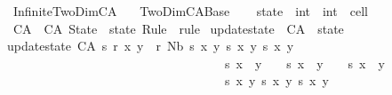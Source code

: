 %
\begin{isabellebody}%
%
%
\isadelimdocument
%
\endisadelimdocument
%
\isatagdocument
%
\isamarkuptrue%
%
\endisatagdocument
{\isafolddocument}%
%
\isadelimdocument
%
\endisadelimdocument
%
\isadelimtheory
%
\endisadelimtheory
%
\isatagtheory
{}\isamarkupfalse%
\ Infinite{\isacharunderscore}TwoDim{\isacharunderscore}CA\isanewline
\ \ \ TwoDim{\isacharunderscore}CA{\isacharunderscore}Base\isanewline
{}%
\endisatagtheory
{\isafoldtheory}%
%
\isadelimtheory
\isanewline
%
\endisadelimtheory
\ \ \isanewline
{}\isamarkupfalse%
\ state\ {\isacharequal}\ {\isachardoublequoteopen}int\ {\isasymRightarrow}\ int\ {\isasymRightarrow}\ cell{\isachardoublequoteclose}\isanewline
\isanewline
{}\isamarkupfalse%
\ CA\ {\isacharequal}\ CA\ {\isacharparenleft}State\ {\isacharcolon}\ state{\isacharparenright}\ {\isacharparenleft}Rule\ {\isacharcolon}\ rule{\isacharparenright}\isanewline
\isanewline
\isanewline
{}\isamarkupfalse%
\ update{\isacharunderscore}state\ {\isacharcolon}{\isacharcolon}\ {\isachardoublequoteopen}CA\ {\isasymRightarrow}\ state{\isachardoublequoteclose}\ \isanewline
{\isachardoublequoteopen}update{\isacharunderscore}state\ {\isacharparenleft}CA\ s\ r{\isacharparenright}\ x\ y\ {\isacharequal}\ r\ {\isacharparenleft}Nb\ {\isacharparenleft}s\ {\isacharparenleft}x{\isacharminus}{}{\isacharparenright}\ {\isacharparenleft}y{\isacharplus}{}{\isacharparenright}{\isacharparenright}\ {\isacharparenleft}s\ x\ {\isacharparenleft}y{\isacharplus}{}{\isacharparenright}{\isacharparenright}\ {\isacharparenleft}s\ {\isacharparenleft}x{\isacharplus}{}{\isacharparenright}\ {\isacharparenleft}y{\isacharplus}{}{\isacharparenright}{\isacharparenright}\isanewline
\ \ \ \ \ \ \ \ \ \ \ \ \ \ \ \ \ \ \ \ \ \ \ \ \ \ \ \ \ \ \ \ \ \ \ {\isacharparenleft}s\ {\isacharparenleft}x{\isacharminus}{}{\isacharparenright}\ \ y{\isacharparenright}\ \ \ \ {\isacharparenleft}s\ x\ \ y{\isacharparenright}\ \ \ \ {\isacharparenleft}s\ {\isacharparenleft}x{\isacharplus}{}{\isacharparenright}\ \ y{\isacharparenright}\isanewline
\ \ \ \ \ \ \ \ \ \ \ \ \ \ \ \ \ \ \ \ \ \ \ \ \ \ \ \ \ \ \ \ \ \ \ {\isacharparenleft}s\ {\isacharparenleft}x{\isacharminus}{}{\isacharparenright}\ {\isacharparenleft}y{\isacharminus}{}{\isacharparenright}{\isacharparenright}\ {\isacharparenleft}s\ x\ {\isacharparenleft}y{\isacharminus}{}{\isacharparenright}{\isacharparenright}\ {\isacharparenleft}s\ {\isacharparenleft}x{\isacharplus}{}{\isacharparenright}\ {\isacharparenleft}y{\isacharminus}{}{\isacharparenright}{\isacharparenright}{\isacharparenright}{\isachardoublequoteclose}\isanewline

\end{isabellebody}
